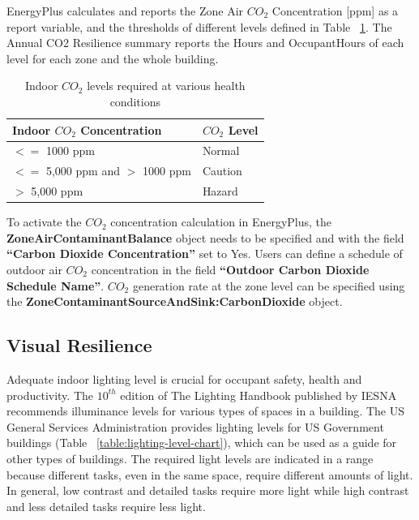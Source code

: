 EnergyPlus calculates and reports the Zone Air $CO_2$ Concentration [ppm] as a
report variable, and the thresholds of different levels defined in Table
~\ref{table:co2-lvel-chart}. The Annual CO2 Resilience summary reports the Hours
and OccupantHours of each level for each zone and the whole building.

\begin{table} \centering
\caption{Indoor $CO_2$ levels required at various health conditions
\protect \label{table:co2-lvel-chart}} \tabularnewline
\begin{tabular}{ |p{2in}|p{2in}| } \hline \textbf{Indoor $CO_2$ Concentration }
& \textbf{$CO_2$ Level} \\ \hline $<=$ 1000 ppm & Normal \\ \hline $<=$ 5,000
ppm and $>$ 1000 ppm & Caution \\ \hline $>$ 5,000 ppm & Hazard \\ \hline
\end{tabular}
\end{table}

To activate the $CO_2$ concentration calculation in EnergyPlus, the
\textbf{ZoneAirContaminantBalance} object needs to be specified and with the
field \textbf{``Carbon Dioxide Concentration''} set to Yes. Users can define a
schedule of outdoor air $CO_2$ concentration in the field \textbf{``Outdoor
Carbon Dioxide Schedule Name''}. $CO_2$ generation rate at the zone level can be
specified using the \textbf{ZoneContaminantSourceAndSink:CarbonDioxide} object.

\subsection{Visual Resilience}\label{visual-resilience}

Adequate indoor lighting level is crucial for occupant safety, health and
productivity. The $10^{th}$ edition of The Lighting Handbook published by IESNA
recommends illuminance levels for various types of spaces in a building. The US
General Services Administration provides lighting levels for US Government
buildings (Table ~\ref{table:lighting-level-chart}), which can be used as a
guide for other types of buildings. The required light levels are indicated in a
range because different tasks, even in the same space, require different amounts
of light. In general, low contrast and detailed tasks require more light while
high contrast and less detailed tasks require less light.

